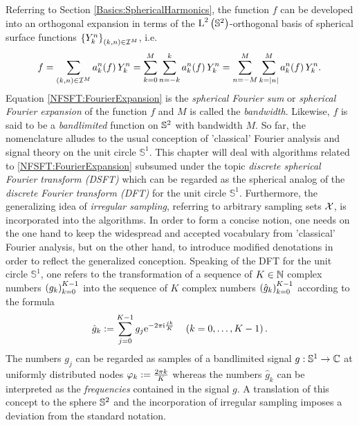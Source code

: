 Referring to Section \ref{Basics:SphericalHarmonics}, the function $f$ can be developed into 
an orthogonal expansion in terms of the $\text{\rm{L}}^{2}\left(\mathbb{S}^2\right)$-orthogonal basis of
spherical surface functions $\left\{Y_{k}^n\right\rbrace_{(k,n) \in \mathcal{I}^M}$, i.e.
\begin{equation}
  \label{NFSFT:FourierExpansion} 
  f = \sum_{\left(k,n\right) \in\mathcal{I}^M} a_k^n{\hspace{-0.4ex}}\left(f\right) Y_{k}^n = \sum_{k=0}^M \sum_{n=-k}^k a_k^n{\hspace{-0.4ex}}\left(f\right) Y_{k}^n = \sum_{n=-M}^M \sum_{k=\left\vert n\right\vert}^M a_k^n{\hspace{-0.4ex}}\left(f\right) Y_{k}^n.
\end{equation}  
Equation \eqref{NFSFT:FourierExpansion} is the \emph{spherical Fourier sum} or 
\emph{spherical Fourier expansion} of the function $f$ and $M$ is called the 
\emph{bandwidth}. Likewise, $f$ is said to be a \emph{bandlimited} function 
on $\mathbb{S}^2$ with bandwidth $M$. So far, the nomenclature alludes to the 
usual conception of 'classical' Fourier analysis and signal theory on the 
unit circle $\mathbb{S}^1$. This chapter will deal with algorithms related 
to \eqref{NFSFT:FourierExpansion} subsumed under the topic \emph{discrete 
spherical Fourier transform (DSFT)} which can be regarded as the spherical 
analog of the \emph{discrete Fourier transform (DFT)} for the unit circle 
$\mathbb{S}^1$. Furthermore, the generalizing idea of \emph{irregular sampling}, 
referring to arbitrary sampling sets $\mathbf{\mathcal{X}}$, is incorporated into 
the algorithms. In order to form a concise notion, one needs on the one hand 
to keep the widespread and accepted vocabulary from 'classical' Fourier 
analysis, but on the other hand, to introduce modified denotations in order 
to reflect the generalized conception. Speaking of the DFT for the unit 
circle $\mathbb{S}^1$, one refers to the transformation of a sequence of $K \in \mathbb{N}$ 
complex numbers $\left(g_{k}\right)_{k=0}^{K-1}$ into the sequence of $K$ 
complex numbers $\left(\hat{g}_{k}\right)_{k=0}^{K-1}$ according to the formula
\[
  \hat{g}_{k} := \sum_{j=0}^{K-1} g_{j} \mbox{\rm{e}}^{-2\pi\mbox{\scriptsize\rm{i}} \frac{jk}{K}} \quad \left(k=0,\ldots,K-1\right).
\]
The numbers $g_{j}$ can be regarded as samples of a bandlimited 
signal $g: \mathbb{S}^1 \rightarrow \mathbb{C}$ at uniformly distributed nodes 
$\varphi_{k} := \frac{2\pi k}{K}$ whereas the numbers $\hat{g}_{k}$
can be interpreted as the \emph{frequencies} contained in the signal $g$.
A translation of this concept to the sphere $\mathbb{S}^2$ and the incorporation 
of irregular sampling imposes a deviation from the standard notation. 


